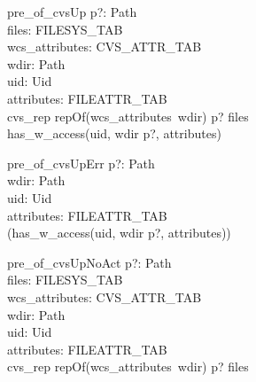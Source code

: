 \begin{schema}{pre\_of\_cvsUp}
  p?: Path \\
  files: FILESYS\_TAB \\
  wcs\_attributes: CVS\_ATTR\_TAB \\
  wdir: Path \\
  uid: Uid \\
  attributes: FILEATTR\_TAB \\
  \where
  cvs\_rep \cat repOf(wcs\_attributes~wdir) \cat p? \in \dom files \\
  has\_w\_access(uid, wdir \cat p?, attributes) \\
\end{schema}
\begin{schema}{pre\_of\_cvsUpErr}
  p?: Path \\
  wdir: Path \\
  uid: Uid \\
  attributes: FILEATTR\_TAB \\
  \where
  \lnot (has\_w\_access(uid, wdir \cat p?, attributes)) \\
\end{schema}
\begin{schema}{pre\_of\_cvsUpNoAct}
  p?: Path \\
  files: FILESYS\_TAB \\
  wcs\_attributes: CVS\_ATTR\_TAB \\
  wdir: Path \\
  uid: Uid \\
  attributes: FILEATTR\_TAB \\
  \where
  cvs\_rep \cat repOf(wcs\_attributes~wdir) \cat p? \notin \dom files \\
\end{schema}
